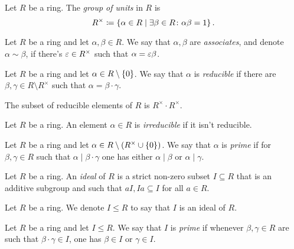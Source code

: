 \documentclass[11pt]{article}
\begin{document}
\begin{definition}
Let $R$ be a ring. The \emph{group of units} in $R$ is
\[R^\times \coloneqq \set{\alpha \in R}{\exists \beta \in R \colon \alpha \beta = 1} \text{.}\]
\end{definition}

\begin{definition}
Let $R$ be a ring and let $\alpha,\beta \in R$. We say that $\alpha, \beta$ are \emph{associates}, and denote $\alpha \sim \beta$, if there's $\varepsilon \in R^\times$ such that $\alpha = \varepsilon \beta$.
\end{definition}

\begin{definition}
Let $R$ be a ring and let $\alpha \in R \setminus \set{0}$. We say that $\alpha$ is \emph{reducible} if there are $\beta,\gamma \in R \setminus R^\times$ such that $\alpha = \beta \cdot \gamma$.
\end{definition}

\begin{remark}
The subset of reducible elements of $R$ is $R^\times \cdot R^\times$.
\end{remark}

\begin{definition}
Let $R$ be a ring. An element $\alpha \in R$ is \emph{irreducible} if it isn't reducible.
\end{definition}

\begin{definition}
Let $R$ be a ring and let $\alpha \in R \setminus \prs{R^\times \cup \set{0}}$. We say that $\alpha$ is \emph{prime} if for $\beta,\gamma \in R$ such that $\alpha \mid \beta \cdot \gamma$ one has either $\alpha \mid \beta$ or $\alpha \mid \gamma$.
\end{definition}

\begin{definition}
Let $R$ be a ring. An \emph{ideal} of $R$ is a strict non-zero subset $I \subseteq R$ that is an additive subgroup and such that $aI, Ia \subseteq I$ for all $a \in R$.
\end{definition}

\begin{notation}
Let $R$ be a ring. We denote $I \leq R$ to say that $I$ is an ideal of $R$.
\end{notation}

\begin{definition}
Let $R$ be a ring and let $I \leq R$. We say that $I$ is \emph{prime} if whenever $\beta,\gamma \in R$ are such that $\beta \cdot \gamma \in I$, one has $\beta \in I$ or $\gamma \in I$.
\end{definition}
\end{document}
